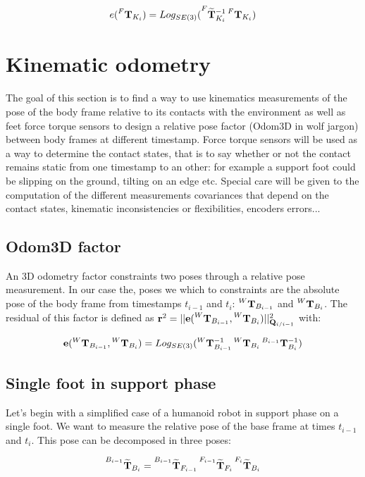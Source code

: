 \documentclass[11pt]{article}
\newcommand{\T}[2]{\prescript{#1}{}{\bfT}_{#2}}
\newcommand{\Tm}[2]{\prescript{#1}{}{\widetilde{\bfT}}_{#2}}
\begin{document}
\begin{equation*}
e(\T{F}{K_i}) = Log_{SE(3)}(\Tm{F}{K_i}^{-1} \T{F}{K_i})    
\end{equation*}



\section{Kinematic odometry}
The goal of this section is to find a way to use kinematics measurements of the pose of the body frame relative to its contacts with the environment as well as feet force torque sensors to design a relative pose factor (Odom3D in wolf jargon) between body frames at different timestamp. Force torque sensors will be used as a way to determine the contact states, that is to say whether or not the contact remains static from one timestamp to an other: for example a support foot could be slipping on the ground, tilting on an edge etc.
Special care will be given to the computation of the different measurements covariances that depend on the contact states, kinematic inconsistencies or flexibilities, encoders errors...

\subsection{Odom3D factor}
An 3D odometry factor constraints two poses through a relative pose measurement. In our case the, poses we which to constraints are the absolute pose of the body frame from timestamps $t_{i-1}$ and $t_{i}$: $\T{W}{B_{i-1}}$ and $\T{W}{B_i}$. The residual of this factor is defined as $\bfr^2 = ||\bfe(\T{W}{B_{i-1}}, \T{W}{B_i})||^2_{\bfQ_{i/i-1}}$
 with:
 
 \begin{equation*}
 \bfe(\T{W}{B_{i-1}}, \T{W}{B_i}) =  Log_{SE(3)}(
 \T{W}{B_{i-1}}^{-1}
 \T{W}{B_i}
 \T{B_{i-1}}{B_i}^{-1}
 )     
 \end{equation*} 

\subsection{Single foot in support phase}
Let's begin with a simplified case of a humanoid robot in support phase on a single foot.
We want to measure the relative pose of the base frame at times $t_{i-1}$ and $t_i$. This pose can be decomposed in three poses: 

\begin{equation*}
\Tm{B_{i-1}}{B_i} = 
\Tm{B_{i-1}}{F_{i-1}}
\Tm{F_{i-1}}{F_{i}} 
\Tm{F_{i}}{B_i}     
\end{equation*}
\end{document}
